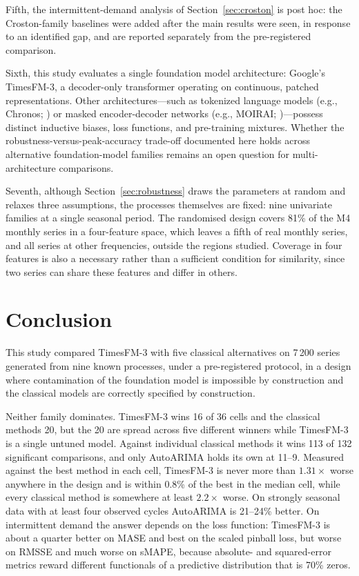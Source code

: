 \documentclass[11pt]{article}
\providecommand{\sectionref}[1]{Section~\ref{#1}}
\begin{document}
Fifth, the intermittent-demand analysis of \sectionref{sec:croston} is post hoc: the
Croston-family baselines were added after the main results were seen, in response to an
identified gap, and are reported separately from the pre-registered comparison.

Sixth, this study evaluates a single foundation model architecture: Google's TimesFM-3, a
decoder-only transformer operating on continuous, patched representations. Other architectures---such
as tokenized language models (e.g., Chronos; \citealp{ansari2024chronos}) or masked encoder-decoder
networks (e.g., MOIRAI; \citealp{woo2024moirai})---possess distinct inductive biases, loss functions,
and pre-training mixtures. Whether the robustness-versus-peak-accuracy trade-off documented here
holds across alternative foundation-model families remains an open question for multi-architecture comparisons.

Seventh, although \sectionref{sec:robustness} draws the parameters at random and relaxes three
assumptions, the processes themselves are fixed: nine univariate families at a single seasonal
period. The randomised design covers 81\% of the M4 monthly series in a four-feature space, which
leaves a fifth of real monthly series, and all series at other frequencies, outside the regions
studied. Coverage in four features is also a necessary rather than a sufficient condition for
similarity, since two series can share these features and differ in others.

\section{Conclusion}
\label{sec:conclusion}

This study compared TimesFM-3 with five classical alternatives on 7\,200 series generated from nine
known processes, under a pre-registered protocol, in a design where contamination of the
foundation model is impossible by construction and the classical models are correctly specified
by construction.

Neither family dominates. TimesFM-3 wins 16 of 36 cells and the classical methods 20, but the
20 are spread across five different winners while TimesFM-3 is a single untuned model. Against
individual classical methods it wins 113 of 132 significant comparisons, and only AutoARIMA
holds its own at 11--9. Measured against the best method in each cell, TimesFM-3 is never more
than $1.31\times$ worse anywhere in the design and is within 0.8\% of the best in the median
cell, while every classical method is somewhere at least $2.2\times$ worse. On strongly seasonal
data with at least four observed cycles AutoARIMA is 21--24\% better. On intermittent demand the
answer depends on the loss function: TimesFM-3 is about a quarter better on MASE and best on the
scaled pinball loss, but worse on RMSSE and much worse on sMAPE, because absolute- and
squared-error metrics reward different functionals of a predictive distribution that is 70\%
zeros.
\end{document}
